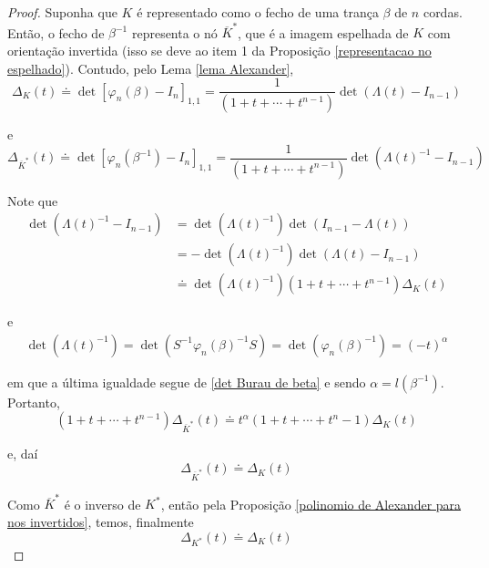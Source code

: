 \documentclass[a4paper,portuguese,11pt,twoside, leqno]{book}
\theoremstyle{definition}
\begin{document}
	\begin{proof}
		Suponha que $K$ é representado como o fecho de uma trança $\beta$ de $n$ cordas. Então, o fecho de $\beta^{-1}$ representa o nó $\overline{K}^{\ast}$, que é a imagem espelhada de $K$ com orientação invertida (isso se deve ao item 1 da Proposição \eqref{representacao no espelhado}). Contudo, pelo Lema \eqref{lema Alexander},
		\begin{equation*}
		\Delta_K(t) \doteq \det[\varphi_n(\beta) - I_n]_{1,1} = \frac{1}{(1+t+\cdots+t^{n-1})}\det(\Lambda(t) - I_{n-1})
		\end{equation*}
		\par\vspace{0.3cm} e
		\begin{equation*}
		\Delta_{\overline{K}^{\ast}}(t) \doteq \det[\varphi_n(\beta^{-1}) - I_n]_{1,1} = \frac{1}{(1+t+\cdots+t^{n-1})}\det(\Lambda(t)^{-1} - I_{n-1})
		\end{equation*}
		\par\vspace{0.3cm} Note que
		\begin{align*}
		\det(\Lambda(t)^{-1} - I_{n-1}) &= \det(\Lambda(t)^{-1})\det(I_{n-1} - \Lambda(t)) \\
		&= -\det(\Lambda(t)^{-1})\det(\Lambda(t) - I_{n-1}) \\
		&\doteq \det(\Lambda(t)^{-1})(1+t+\cdots+t^{n-1})\Delta_K(t) 
		\end{align*}
		\par\vspace{0.3cm} e
		\begin{align*}
		\det(\Lambda(t)^{-1}) = \det( S^{-1}\varphi_n(\beta)^{-1}S ) = \det(\varphi_n(\beta)^{-1}) = (-t)^{\alpha}
		\end{align*}
		\par\vspace{0.3cm} em que a última igualdade segue de \eqref{det Burau de beta} e sendo $\alpha = l(\beta^{-1})$. Portanto, 
		\begin{equation*}
		(1+t+\cdots+t^{n-1})\Delta_{\overline{K}^{\ast}}(t)\doteq t^{\alpha}(1+t+\cdots+t^n-1)\Delta_K(t)
		\end{equation*}
		\par\vspace{0.3cm} e, daí
		\begin{equation*}
		\Delta_{\overline{K}^{\ast}}(t) \doteq \Delta_K(t)
		\end{equation*}
		\par\vspace{0.3cm} Como $\overline{K}^{\ast}$ é o inverso de $K^\ast$, então pela Proposição \eqref{polinomio de Alexander para nos invertidos}, temos, finalmente
		\begin{equation*}
		\Delta_{K^\ast}(t) \doteq \Delta_K(t)
		\end{equation*}
	\end{proof}
\end{document}

